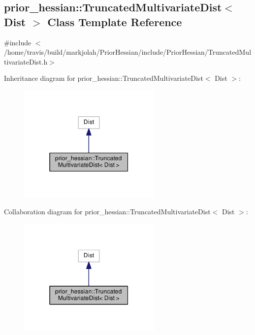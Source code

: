 \hypertarget{classprior__hessian_1_1TruncatedMultivariateDist}{}\subsection{prior\+\_\+hessian\+:\+:Truncated\+Multivariate\+Dist$<$ Dist $>$ Class Template Reference}
\label{classprior__hessian_1_1TruncatedMultivariateDist}


{\ttfamily \#include $<$/home/travis/build/markjolah/\+Prior\+Hessian/include/\+Prior\+Hessian/\+Truncated\+Multivariate\+Dist.\+h$>$}



Inheritance diagram for prior\+\_\+hessian\+:\+:Truncated\+Multivariate\+Dist$<$ Dist $>$\+:\nopagebreak
\begin{figure}[H]
\begin{center}
\leavevmode
\includegraphics[width=199pt]{classprior__hessian_1_1TruncatedMultivariateDist__inherit__graph}
\end{center}
\end{figure}


Collaboration diagram for prior\+\_\+hessian\+:\+:Truncated\+Multivariate\+Dist$<$ Dist $>$\+:\nopagebreak
\begin{figure}[H]
\begin{center}
\leavevmode
\includegraphics[width=199pt]{classprior__hessian_1_1TruncatedMultivariateDist__coll__graph}
\end{center}
\end{figure}
